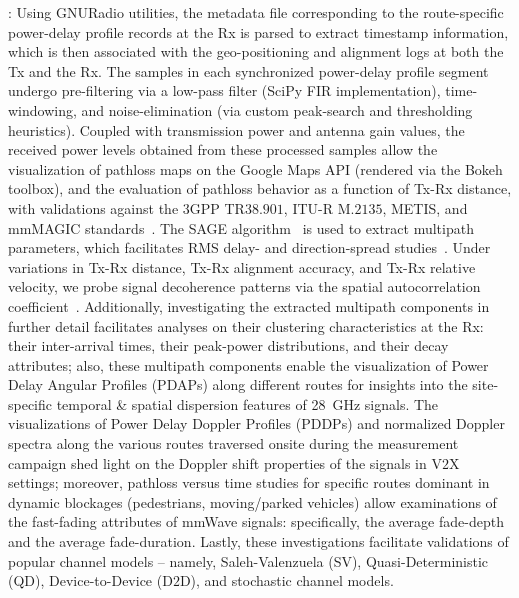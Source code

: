 \documentclass[12pt, draftcls, onecolumn]{IEEEtran}
\begin{document}
: Using GNURadio utilities, the metadata file corresponding to the route-specific power-delay profile records at the Rx is parsed to extract timestamp information, which is then associated with the geo-positioning and alignment logs at both the Tx and the Rx. The samples in each synchronized power-delay profile segment undergo pre-filtering via a low-pass filter (SciPy FIR implementation), time-windowing, and noise-elimination (via custom peak-search and thresholding heuristics). Coupled with transmission power and antenna gain values, the received power levels obtained from these processed samples allow the visualization of pathloss maps on the Google Maps API (rendered via the Bokeh toolbox), and the evaluation of pathloss behavior as a function of Tx-Rx distance, with validations against the $3$GPP TR$38.901$, ITU-R M$.2135$, METIS, and mmMAGIC standards~\cite{MacCartneyModelsOverview}. The SAGE algorithm~\cite{SAGE} is used to extract multipath parameters, which facilitates RMS delay- and direction-spread studies~\cite{Indoor60G}. Under variations in Tx-Rx distance, Tx-Rx alignment accuracy, and Tx-Rx relative velocity, we probe signal decoherence patterns via the spatial autocorrelation coefficient~\cite{MacCartneySpatialStatistics}. Additionally, investigating the extracted multipath components in further detail facilitates analyses on their clustering characteristics at the Rx: their inter-arrival times, their peak-power distributions, and their decay attributes; also, these multipath components enable the visualization of Power Delay Angular Profiles (PDAPs) along different routes for insights into the site-specific temporal \& spatial dispersion features of \SI{28}{\giga\hertz} signals. The visualizations of Power Delay Doppler Profiles (PDDPs) and normalized Doppler spectra along the various routes traversed onsite during the measurement campaign shed light on the Doppler shift properties of the signals in V$2$X settings; moreover, pathloss versus time studies for specific routes dominant in  dynamic blockages (pedestrians, moving/parked vehicles) allow examinations of the fast-fading attributes of mmWave signals: specifically, the average fade-depth and the average fade-duration. Lastly, these investigations facilitate validations of popular channel models -- namely, Saleh-Valenzuela (SV), Quasi-Deterministic (QD), Device-to-Device (D$2$D), and stochastic channel models.
\vspace{-3mm}

\end{document}
